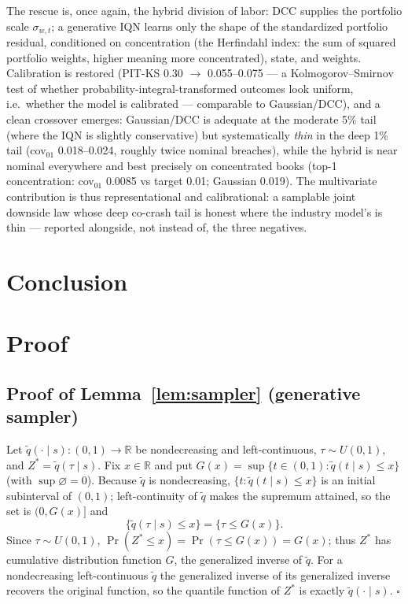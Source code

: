 \documentclass[11pt]{article}
\theoremstyle{remark}
\begin{document}
The rescue is, once again, the hybrid division of labor: DCC supplies
the portfolio scale $\sigma_{w,t}$; a generative IQN learns only the
shape of the standardized portfolio residual, conditioned on
concentration (the Herfindahl index: the sum of squared portfolio
weights, higher meaning more concentrated), state, and weights.
Calibration is restored
(PIT-KS 0.30 $\to$ 0.055--0.075 --- a Kolmogorov--Smirnov test of
whether probability-integral-transformed outcomes look uniform, i.e.\
whether the model is calibrated --- comparable to Gaussian/DCC), and a
clean crossover emerges: Gaussian/DCC is adequate at the moderate 5\%
tail (where the IQN is slightly conservative) but systematically
\emph{thin} in the deep 1\% tail (cov$_{01}$ 0.018--0.024, roughly twice
nominal breaches), while the hybrid is near nominal everywhere and best
precisely on concentrated books (top-1 concentration: cov$_{01}$ 0.0085
vs target 0.01; Gaussian 0.019). The multivariate contribution is thus
representational and calibrational: a samplable joint downside law whose
deep co-crash tail is honest where the industry model's is thin ---
reported alongside, not instead of, the three negatives.


\section{Conclusion}\label{sec:conclusion}




\appendix
\section{Proof}\label{app:proofs}
\subsection*{Proof of Lemma~\ref{lem:sampler} (generative sampler)}

Let $\widetilde q(\cdot\mid s):(0,1)\to\mathbb{R}$ be nondecreasing and
left-continuous, $\tau\sim U(0,1)$, and $Z^*=\widetilde q(\tau\mid s)$.
Fix $x\in\mathbb{R}$ and put $G(x)=\sup\{t\in(0,1):\widetilde q(t\mid
s)\le x\}$ (with $\sup\varnothing=0$). Because $\widetilde q$ is
nondecreasing, $\{t:\widetilde q(t\mid s)\le x\}$ is an initial
subinterval of $(0,1)$; left-continuity of $\widetilde q$ makes the
supremum attained, so the set is $(0,G(x)]$ and
\[
\{\widetilde q(\tau\mid s)\le x\}=\{\tau\le G(x)\}.
\]
Since $\tau\sim U(0,1)$, $\Pr(Z^*\le x)=\Pr(\tau\le G(x))=G(x)$; thus
$Z^*$ has cumulative distribution function $G$, the generalized inverse
of $\widetilde q$. For a nondecreasing left-continuous $\widetilde q$
the generalized inverse of its generalized inverse recovers the
original function, so the quantile function of $Z^*$ is exactly
$\widetilde q(\cdot\mid s)$. \hfill$\square$
\end{document}
